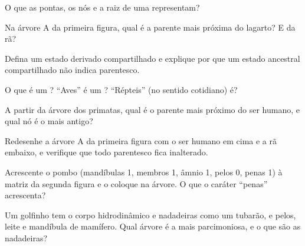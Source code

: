 \begin{exercise}[$\star$]\label{exo:g12:phylogenetic-trees:1}
O que as pontas, os nós e a raiz de uma 
representam?
\end{exercise}

\begin{exercise}[$\star$]\label{exo:g12:phylogenetic-trees:2}
Na árvore A da primeira figura, qual  é a parente mais próxima
do lagarto? E da rã?
\end{exercise}

\begin{exercise}[$\star$]\label{exo:g12:phylogenetic-trees:3}
Defina um estado derivado compartilhado e explique por que um estado
ancestral compartilhado não indica parentesco.
\end{exercise}

\begin{exercise}[$\star$]\label{exo:g12:phylogenetic-trees:4}
O que é um ? ``Aves'' é um ? ``Répteis'' (no sentido
cotidiano) é?
\end{exercise}

\begin{exercise}[$\star$]\label{exo:g12:phylogenetic-trees:5}
A partir da árvore dos primatas, qual é o parente mais próximo do ser
humano, e qual nó é o mais antigo?
\end{exercise}

\begin{exercise}[$\star\star$]\label{exo:g12:phylogenetic-trees:6}
Redesenhe a árvore A da primeira figura com o ser humano em cima e a rã
embaixo, e verifique que todo parentesco fica inalterado.
\end{exercise}

\begin{exercise}[$\star\star$]\label{exo:g12:phylogenetic-trees:7}
Acrescente o pombo (mandíbulas 1, membros 1, âmnio 1, pelos 0, penas 1)
à matriz da segunda figura e o coloque na árvore. O que o caráter
``penas'' acrescenta?
\end{exercise}

\begin{exercise}[$\star\star$]\label{exo:g12:phylogenetic-trees:8}
Um golfinho tem o corpo hidrodinâmico e nadadeiras como um tubarão, e
pelos, leite e mandíbula de mamífero. Qual árvore é a mais
parcimoniosa, e o que são as nadadeiras?
\end{exercise}

